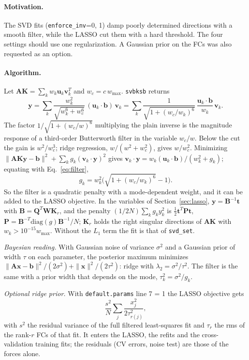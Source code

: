 \documentclass[11pt,a4paper]{article}
\newcommand{\bA}{\mathbf A}
\newcommand{\bK}{\mathbf K}
\newcommand{\bQ}{\mathbf Q}
\newcommand{\bW}{\mathbf W}
\newcommand{\bx}{\mathbf x}
\newcommand{\by}{\mathbf y}
\newcommand{\bt}{\mathbf t}
\newcommand{\bb}{\mathbf b}
\newcommand{\bu}{\mathbf u}
\newcommand{\bv}{\mathbf v}
\newcommand{\code}[1]{\texttt{#1}}
\begin{document}
\paragraph{Motivation.} The SVD fits (\code{enforce\_inv}=0, 1) damp poorly determined directions with a
smooth filter, while the LASSO cut them with a hard threshold. The four settings should use one
regularization. A Gaussian prior on the FCs was also requested as an option.

\paragraph{Algorithm.} Let $\bA\bK=\sum_kw_k\bu_k\bv_k^T$ and $w_c=c\,w_{\max}$. \code{svbksb} returns
\begin{equation}
\by=\sum_k\frac{w_k^2}{\sqrt{w_k^6+w_c^6}}\,(\bu_k\cdot\bb)\,\bv_k
=\sum_k\frac1{\sqrt{1+(w_c/w_k)^6}}\,\frac{\bu_k\cdot\bb}{w_k}\,\bv_k .
\label{eq:filter}
\end{equation}
The factor $1/\sqrt{1+(w_c/w)^6}$ multiplying the plain inverse is the magnitude response of a
third-order Butterworth filter in the variable $w_c/w$. Below the cut the gain is $w^2/w_c^3$; ridge
regression, $w/(w^2+w_c^2)$, gives $w/w_c^2$. Minimizing $\|\bA\bK\by-\bb\|^2+\sum_kg_k(\bv_k\cdot\by)^2$ gives
$\bv_k\cdot\by=w_k(\bu_k\cdot\bb)/(w_k^2+g_k)$; equating with Eq.~\eqref{eq:filter},
\begin{equation}
g_k=w_k^2\Big(\sqrt{1+(w_c/w_k)^6}-1\Big).
\end{equation}
So the filter is a quadratic penalty with a mode-dependent weight, and it can be added to the LASSO
objective. In the variables of Section~\ref{sec:lasso}, $\by=\mathbf B^{-1}\bt$ with $\mathbf B=\bQ^T\bW\bK_r$, and the
penalty $(1/2N)\sum_kg_ky_k^2$ is $\tfrac12\bt^T\mathbf P\bt$, $\mathbf P=\mathbf B^{-T}\mathrm{diag}(g)\mathbf B^{-1}/N$;
$\bK_r$ holds the right singular directions of $\bA\bK$ with $w_k>10^{-15}w_{\max}$. Without the $L_1$ term the
fit is that of \code{svd\_set}.

\emph{Bayesian reading.} With Gaussian noise of variance $\sigma^2$ and a Gaussian prior of width $\tau$ on each
parameter, the posterior maximum minimizes $\|\bA\bx-\bb\|^2/(2\sigma^2)+\|\bx\|^2/(2\tau^2)$: ridge with
$\lambda_2=\sigma^2/\tau^2$. The filter is the same with a prior width that depends on the mode, $\tau_k^2=\sigma^2/g_k$.

\emph{Optional ridge prior.} With \code{default.params} line 7 = 1 the LASSO objective gets
\begin{equation}
\frac{s^2}N\sum_j\frac{x_j^2}{2\tau_{r(j)}^2},
\end{equation}
with $s^2$ the residual variance of the full filtered least-squares fit and $\tau_r$ the rms of the rank-$r$
FCs of that fit. It enters the LASSO, the refits and the cross-validation training fits; the residuals
(CV errors, noise test) are those of the forces alone.
\end{document}
